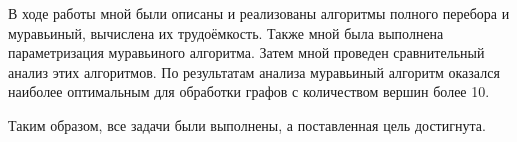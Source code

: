 
В ходе работы мной были описаны и реализованы алгоритмы полного перебора и муравьиный, вычислена их трудоёмкость. Также мной была выполнена параметризация муравьиного алгоритма. Затем мной проведен сравнительный анализ этих алгоритмов. По результатам анализа муравьиный алгоритм оказался наиболее оптимальным для обработки графов с количеством вершин более 10.

Таким образом, все задачи были выполнены, а поставленная цель достигнута.